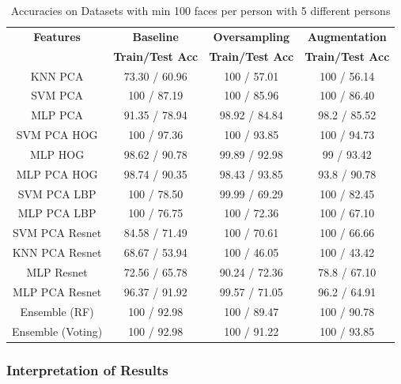 \documentclass[a4paper]{article}
\theoremstyle{plain}
\theoremstyle{definition}
\begin{document}
\begin{table}[htbp]
    \centering
    \begin{tabular}{|c|c|c|c|}
    \hline
    \textbf{Features} & \textbf{Baseline} & \textbf{Oversampling} & \textbf{Augmentation}\\
    \textbf{} & \textbf{Train/Test Acc} & \textbf{Train/Test Acc} & \textbf{Train/Test Acc }\\
    \hline
    KNN PCA & 73.30 / 60.96 & 100 / 57.01 & 100 / 56.14 \\
    \hline
    SVM PCA & 100 / 87.19 & 100 / 85.96 & 100 / 86.40 \\
    \hline
    MLP PCA & 91.35 / 78.94 & 98.92 / 84.84 & 98.2 / 85.52 \\
    \hline
    SVM PCA HOG  & 100 / 97.36 & 100 / 93.85 & 100 / 94.73 \\
    \hline
    MLP HOG & 98.62 / 90.78 & 99.89 / 92.98 & 99 / 93.42 \\
    \hline
    MLP PCA HOG & 98.74 / 90.35 & 98.43 / 93.85 & 93.8 / 90.78 \\
    \hline
    SVM PCA LBP & 100 / 78.50 & 99.99 / 69.29 & 100 / 82.45 \\
    \hline
    MLP PCA LBP & 100 / 76.75 & 100 / 72.36 & 100 / 67.10 \\
    \hline
    SVM PCA Resnet & 84.58 / 71.49 & 100 / 70.61 & 100 / 66.66 \\
    \hline
    KNN PCA Resnet & 68.67 / 53.94 & 100 / 46.05 & 100 / 43.42 \\
    \hline
    MLP Resnet & 72.56 / 65.78 & 90.24 / 72.36  & 78.8 / 67.10  \\
    \hline
    MLP PCA Resnet & 96.37 / 91.92 & 99.57 / 71.05 & 96.2 / 64.91 \\
    \hline
    Ensemble (RF) & 100 / 92.98 & 100 / 89.47 & 100 / 90.78 \\
    \hline
    Ensemble (Voting) & 100 / 92.98 & 100 / 91.22 & 100 / 93.85 \\
    \hline
    \end{tabular}
    \caption{Accuracies on Datasets with min 100 faces per person with 5 different persons}
    \label{tab:accuracy1}
\end{table}
	
\subsubsection{Interpretation of Results}
\end{document}
